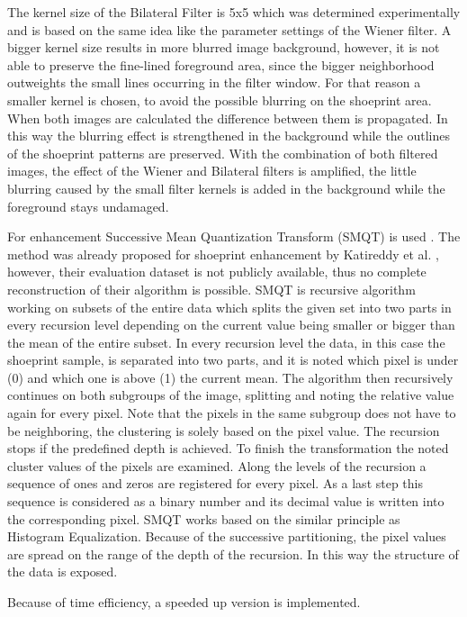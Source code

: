\documentclass[draft,final]{vutinfth} %
\begin{document}
The kernel size of the Bilateral Filter is 5x5 which was determined experimentally and is based on the same idea like the parameter settings of the Wiener filter.
A bigger kernel size results in more blurred image background, however, it is not able to preserve the fine-lined foreground area, since the bigger neighborhood outweights the small lines occurring in the filter window.
For that reason a smaller kernel is chosen, to avoid the possible blurring on the shoeprint area.
When both images are calculated the difference between them is propagated.
In this way the blurring effect is strengthened in the background while the outlines of the shoeprint patterns are preserved.
With the combination of both filtered images, the effect of the Wiener and Bilateral filters is amplified, the little blurring caused by the small filter kernels is added in the background while the foreground stays undamaged.
\par
For enhancement Successive Mean Quantization Transform (SMQT) is used \cite{nilsson2013smqt}.
The method was already proposed for shoeprint enhancement by Katireddy et al. \cite{katireddy2017novel}, however, their evaluation dataset  is not publicly available, thus no complete reconstruction of their algorithm is possible.
SMQT is recursive algorithm working on subsets of the entire data which splits the given set into two parts in every recursion level depending on the current value being smaller or bigger than the mean of the entire subset.
In every recursion level the data, in this case the shoeprint sample, is separated into two parts, and it is noted which pixel is under (0) and which one is above (1) the current mean.
The algorithm then recursively continues on both subgroups of the image, splitting and noting the relative value again for every pixel.
Note that the pixels in the same subgroup does not have to be neighboring, the clustering is solely based on the pixel value.
The recursion stops if the predefined depth is achieved.
To finish the transformation the noted cluster values of the pixels are examined.
Along the levels of the recursion a sequence of ones and zeros are registered for every pixel.
As a last step this sequence is considered as a binary number and its decimal value is written into the corresponding pixel.
SMQT works based on the similar principle as Histogram Equalization.
Because of the successive partitioning, the pixel values are spread on the range of the depth of the recursion.
In this way the structure of the data is exposed.
\par
Because of time efficiency, a speeded up version is implemented.
\end{document}
